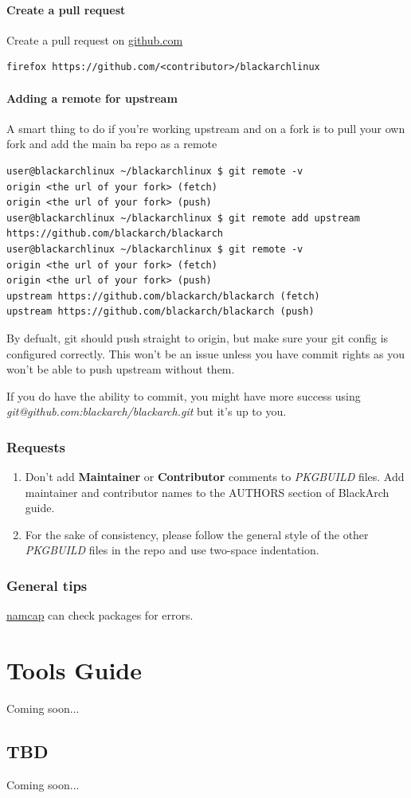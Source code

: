 \documentclass[a4paper, oneside, 11pt]{book}
\begin{document}
\subsubsection{Create a pull request}
Create a pull request on \href{https://github.com/}{github.com}
{\small
\color{gray}
\begin{verbatim}
firefox https://github.com/<contributor>/blackarchlinux
\end{verbatim}
}

\subsubsection{Adding a remote for upstream}
A smart thing to do if you're working upstream and on a fork is to pull your own fork and add the main ba repo as a remote
{\small
\color{gray}
\begin{verbatim}
user@blackarchlinux ~/blackarchlinux $ git remote -v
origin <the url of your fork> (fetch)
origin <the url of your fork> (push)
user@blackarchlinux ~/blackarchlinux $ git remote add upstream https://github.com/blackarch/blackarch
user@blackarchlinux ~/blackarchlinux $ git remote -v
origin <the url of your fork> (fetch)
origin <the url of your fork> (push)
upstream https://github.com/blackarch/blackarch (fetch)
upstream https://github.com/blackarch/blackarch (push)
\end{verbatim}
By defualt, git should push straight to origin, but make sure your git config is configured correctly. This won't be an issue unless you have commit rights as you won't be able to push upstream without them.

If you do have the ability to commit, you might have more success using \textit{git@github.com:blackarch/blackarch.git} but it's up to you.
}
\subsection{Requests}
\begin{enumerate}
\item Don't add \textbf{Maintainer} or \textbf{Contributor} comments to
\textit{PKGBUILD} files. Add maintainer and contributor names to the
AUTHORS section of BlackArch guide.
\item For the sake of consistency, please follow the general style of the other
\textit{PKGBUILD} files in the repo and use two-space indentation.
\end{enumerate}

\subsection{General tips}
\href{http://wiki.archlinux.org/index.php/Namcap}{namcap} can check packages for
errors.


\chapter{Tools Guide}
Coming soon...

\section{TBD}
Coming soon...

\appendix

\end{document}

